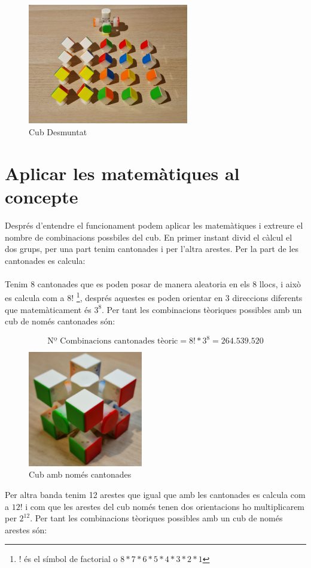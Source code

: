 \begin{figure}[ht]
    \centering
    \includegraphics[width=7cm]{img/figures/cub-desmontat.jpg}
    \caption{Cub Desmuntat}
    \label{fig:cub-desmuntat}
\end{figure}

\section{Aplicar les matemàtiques al concepte}

Després d'entendre el funcionament podem aplicar les matemàtiques i extreure el nombre de combinacions possbiles del cub. En primer instant divid el càlcul el dos grups, per una part tenim cantonades i per l'altra arestes.
Per la part de les cantonades es calcula:
\\\\Tenim 8 cantonades que es poden posar de manera aleatoria en els 8 llocs, i això es calcula com a $ 8! $ \footnote{! és el símbol de factorial o $8*7*6*5*4*3*2*1$}, després aquestes es poden orientar en 3 direccions diferents que matemàticament és $ 3^8 $. Per tant les combinacions tèoriques possibles amb un cub de només cantonades són:

$$ \textrm{Nº Combinacions cantonades tèoric} = 8!*3^8 = 264.539.520 $$

\begin{figure}[h]
    \centering
    \includegraphics[width=5cm]{img/figures/only-corners.jpg}
    \caption{Cub amb només cantonades}
    \label{fig:only-corners}
\end{figure}
Per altra banda tenim 12 arestes que igual que amb les cantonades es calcula com a $ 12! $ i com que les arestes del cub només tenen dos orientacions ho multiplicarem per $2^12$. Per tant les combinacions tèoriques possibles amb un cub de només arestes són:  

